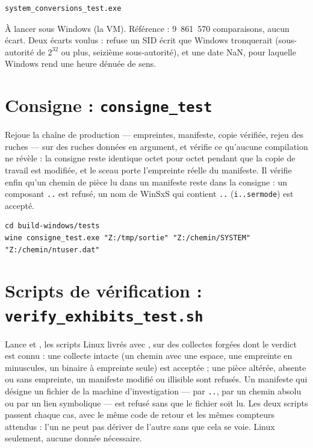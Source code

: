 \documentclass[11pt,a4paper,oneside]{report}
\begin{document}
\begin{lstlisting}
system_conversions_test.exe
\end{lstlisting}

À lancer sous Windows (la VM). Référence : 9~861~570 comparaisons, aucun écart.
Deux écarts voulus : \wac{} refuse un SID écrit que Windows tronquerait
(sous-autorité de $2^{32}$ ou plus, seizième sous-autorité), et une date NaN,
pour laquelle Windows rend une heure dénuée de sens.

\section{Consigne : \texttt{consigne\_test}}

Rejoue la chaîne de production — empreintes, manifeste, copie vérifiée, rejeu
des ruches — sur des ruches données en argument, et vérifie ce qu'aucune
compilation ne révèle : la consigne reste identique octet pour octet pendant que
la copie de travail est modifiée, et le sceau porte l'empreinte réelle du
manifeste. Il vérifie enfin qu'un chemin de pièce lu dans un manifeste reste
dans la consigne : un composant \texttt{..} est refusé, un nom de WinSxS qui
contient \texttt{..} (\texttt{i..sermode}) est accepté.

\begin{lstlisting}
cd build-windows/tests
wine consigne_test.exe "Z:/tmp/sortie" "Z:/chemin/SYSTEM" "Z:/chemin/ntuser.dat"
\end{lstlisting}

\section{Scripts de vérification : \texttt{verify\_exhibits\_test.sh}}

Lance  et , les
scripts Linux livrés avec , sur des collectes forgées dont le
verdict est connu : une collecte intacte (un chemin avec une espace, une
empreinte en minuscules, un binaire à empreinte seule) est acceptée ; une pièce
altérée, absente ou sans empreinte, un manifeste modifié ou illisible sont
refusés. Un manifeste qui désigne un fichier de la machine d'investigation —
par \texttt{..}, par un chemin absolu ou par un lien symbolique — est refusé
sans que le fichier soit lu. Les deux scripts passent chaque cas, avec le même
code de retour et les mêmes compteurs attendus : l'un ne peut pas dériver de
l'autre sans que cela se voie. Linux seulement, aucune donnée nécessaire.
\end{document}
